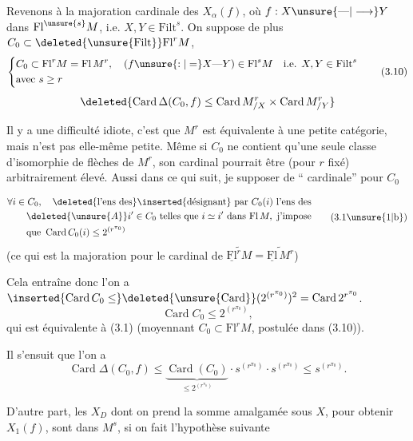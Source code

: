 
Revenons à la majoration cardinale des
$X_\alpha(f)$, où $f:X\unsure{\text{---}|\longrightarrow}Y$  dans $\mathrm{Fl}^{\unsure{s}}M$, i.e.
$X,Y\in\mathrm{Filt}^s$. On suppose de plus $C_0\subset\deleted{\unsure{\mathrm{Filt}}}\mathrm{Fl}^rM$,
\[
\left\{\begin{aligned}
&C_0\subset\mathrm{Fl}^rM=\mathrm{Fl}\,M^r,\quad
(f\unsure{:|=}X\text{---}Y)\in\mathrm{Fl}^sM\quad\text{i.e. }X,Y\in\mathrm{Filt}^s\\
&\text{avec }s\geq r
\end{aligned}\right.
\tag*{(3.10)}
\]
\[
\deleted{\operatorname{Card}\Delta(C_0,f)\leq\operatorname{Card}M^r_{/X}\times\operatorname{Card}M^r_{/Y}}
\]

Il y a une difficulté idiote, c'est que
 $M^r$ est équivalente à une petite catégorie,
mais n'est pas elle-même petite. Même si
$C_0$ ne contient qu'une seule classe d'isomorphie de flèches de $M^r$, son cardinal pourrait
être (pour $r$ fixé) arbitrairement élevé. Aussi
dans ce qui suit, je  supposer 
 
de `` cardinale'' pour $C_0$

\[
\begin{aligned}
&\forall i\in C_0,\quad\deleted{\text{l'ens des}}\inserted{\text{désignant}} \text{ par }C_0(i)\text{ l'ens des}\\
&\qquad\deleted{\unsure{A}}i'\in C_0\text{ telles que }i\simeq i'\text{ dans }\mathrm{Fl}\,M,\text{ j'impose}\\
&\qquad\text{que }\operatorname{Card}C_0(i)\leq 2^{(r^{\pi_0})}
\end{aligned}
\tag*{(3.1\unsure{1|b})}
\]
(ce qui est  la  majoration pour le cardinal de
$\widetilde{\underline{\mathrm{Fl}}^rM}=\widetilde{\underline{\mathrm{Fl}}\,M^r}$)

Cela entraîne donc  l'on a
$\inserted{\operatorname{Card}C_0\leq}\deleted{\unsure{\operatorname{Card}}}(2^{(r^{\pi_0})})^2=\operatorname{Card}2^{r^{\pi_0}}$.
\[
\operatorname{Card}C_0\leq 2^{(r^{\pi_0})},
\tag*{(3.12)}
\]
qui est équivalente à (3.1) (moyennant $C_0\subset\mathrm{Fl}^rM$,
postulée dans (3.10)).

Il s'ensuit  que l'on a
\[
\operatorname{Card}\Delta(C_0,f)\leq
\underbrace{\operatorname{Card}(C_0)}_{\leq 2^{(r^{\pi_0})}}
\mathbin{\cdot}s^{(r^{\pi_0})}\mathbin{\cdot}s^{(r^{\pi_0})}\leq s^{(r^{\pi_0})}.
\]

D'autre part, les $X_D$ dont on prend la somme
amalgamée sous $X$, pour obtenir $X_1(f)$,
sont dans $M^s$, si on fait l'hypothèse suivante
